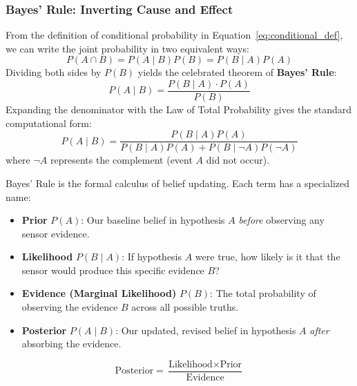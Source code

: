 \subsubsection{Bayes' Rule: Inverting Cause and Effect}
From the definition of conditional probability in Equation~\eqref{eq:conditional_def}, we can write the joint probability in two equivalent ways:
\begin{equation}
P(A \cap B) = P(A \mid B) P(B) = P(B \mid A) P(A)
\end{equation}
Dividing both sides by $P(B)$ yields the celebrated theorem of \textbf{Bayes' Rule}:
\begin{equation}
P(A \mid B) = \frac{P(B \mid A) \cdot P(A)}{P(B)}\label{eq:bayes_rule}
\end{equation}
Expanding the denominator with the Law of Total Probability gives the standard computational form:
\begin{equation}
P(A \mid B) = \frac{P(B \mid A) P(A)}{P(B \mid A)P(A) + P(B \mid \neg A)P(\neg A)}\label{eq:bayes_rule_expanded}
\end{equation}
where $\neg A$ represents the complement (event $A$ did not occur).

\begin{keyidea}
Bayes' Rule is the formal calculus of belief updating. Each term has a specialized name:
\begin{itemize}
    \item \textbf{Prior} $P(A)$: Our baseline belief in hypothesis $A$ \textit{before} observing any sensor evidence.
    \item \textbf{Likelihood} $P(B \mid A)$: If hypothesis $A$ were true, how likely is it that the sensor would produce this specific evidence $B$?
    \item \textbf{Evidence (Marginal Likelihood)} $P(B)$: The total probability of observing the evidence $B$ across all possible truths.
    \item \textbf{Posterior} $P(A \mid B)$: Our updated, revised belief in hypothesis $A$ \textit{after} absorbing the evidence.
\end{itemize}
\begin{equation*}
\text{Posterior} = \frac{\text{Likelihood} \times \text{Prior}}{\text{Evidence}}
\end{equation*}
\end{keyidea}

